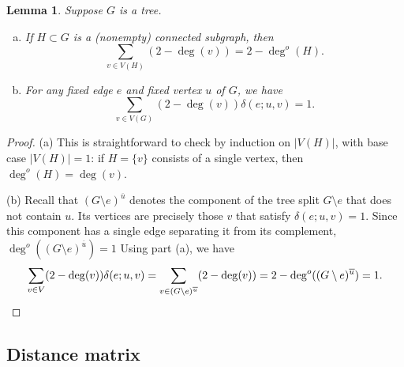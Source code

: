 \documentclass{amsart}
\newtheorem{lem}[thm]{Lemma}
\theoremstyle{definition}
\newcommand{\degout}{\deg^o}
\begin{document}
\begin{lem}
\label{lem:outdeg-sum}
Suppose $G$ is a tree.
\begin{enumerate}[(a)]
\item 
If $H\subset G$ is a (nonempty) connected subgraph, then
\[
  \sum_{v \in V(H)} \left( 2 -  \deg(v) \right) = 2 - \degout(H) .
\]

\item 
For any fixed edge $e$ and fixed vertex $u$ of $G$, we have
\[
	\sum_{v \in V(G)} (2 - \deg(v)) \delta(e; u,v) = 1.
\]

\end{enumerate}
\end{lem}
\begin{proof}
(a)
This is straightforward to check by induction on $|V(H)|$,
with base case $|V(H)| = 1$:
if $H = \{v\}$ consists of a single vertex, then $\degout(H) = \deg(v)$.
%

(b)
Recall that $(G \setminus e)^{\overline u}$ denotes the component of the tree split $G \setminus e$ that does not contain $u$.
Its vertices are precisely those $v$ that satisfy $\delta(e; u, v) = 1$.
Since this component has a single edge separating it from its complement, 
$\degout((G \setminus e)^{\overline u}) = 1$
Using part (a), we have
\[
	\sum_{v \in V} (2 - \deg(v)) \delta(e; u,v)
	= \sum_{v \in (G \setminus e)^{\overline u}} (2 - \deg(v))
	= 2 - \degout((G \setminus e)^{\overline u}) = 1. 
	\qedhere
\] 
\end{proof}

\subsection{Distance matrix}
\end{document}
